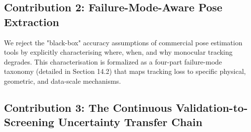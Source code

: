 \subsection{Contribution 2: Failure-Mode-Aware Pose Extraction}
\label{sec:14-1-2-contribution-2-failure-mode-aware-pose-extraction}

We reject the "black-box" accuracy assumptions of commercial pose estimation tools by explicitly characterising where, when, and why monocular tracking degrades. This characterisation is formalized as a four-part failure-mode taxonomy (detailed in Section 14.2) that maps tracking loss to specific physical, geometric, and data-scale mechanisms.

\subsection{Contribution 3: The Continuous Validation-to-Screening Uncertainty Transfer Chain}
\label{sec:14-1-3-contribution-3-the-continuous-validation-to-screening-uncertainty-transfer-chain}

